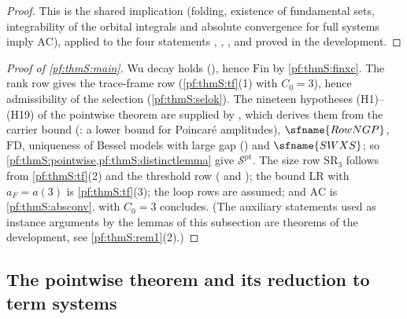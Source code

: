 \begin{proof}
This is the shared implication  (folding, existence of
fundamental sets, integrability of the orbital integrals and absolute convergence for full systems imply
$\mathrm{AC}$), applied to the four statements
, , , and 
proved in the development.
\end{proof}

\begin{proof}[Proof of \cref{pf:thmS:main}]
Wu decay holds (), hence $\mathrm{Fin}$ by
\cref{pf:thmS:finxc}. The rank row gives the trace-frame row (\cref{pf:thmS:tf}(1) with $C_0=3$), hence
admissibility of the selection (\cref{pf:thmS:selok}). The nineteen hypotheses (H1)--(H19) of the pointwise theorem are supplied by , which derives
them from the carrier bound (: a lower bound for Poincar\'e amplitudes), $\sfname{RowNGP}$,
$\mathrm{FD}$, uniqueness of Bessel models with large gap ()
and $\sfname{SWXS}$; so \cref{pf:thmS:pointwise,pf:thmS:distinctlemma} give $\mathcal{S}^{\mathrm{pt}}$. The size
row $\mathrm{SR}_{3}$ follows from \cref{pf:thmS:tf}(2) and the threshold row
( and ); the bound
$\mathrm{LR}$ with $a_F=a(3)$ is \cref{pf:thmS:tf}(3); the loop rows are assumed; and $\mathrm{AC}$ is
\cref{pf:thmS:absconv}.  with $C_0=3$ concludes. (The auxiliary statements used as instance arguments by the lemmas of this subsection are theorems of the development, see \cref{pf:thmS:rem1}(2).)
\end{proof}

\subsection{The pointwise theorem and its reduction to term systems}\label{sec:pf:thmS:pw}

